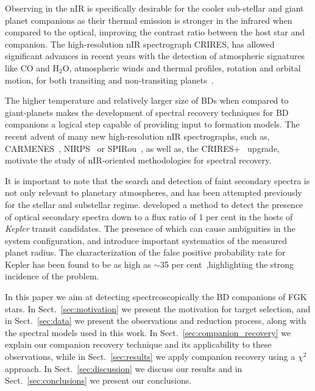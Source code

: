 \documentclass[fleqn,usenatbib]{mnras}
\newcommand*\bl{\color{blue}}
\begin{document}
    Observing in the nIR is specifically desirable for the cooler sub-stellar and giant planet companions as their thermal emission is stronger in the infrared {\bl when compared to the optical, improving the contrast ratio between the host star and companion. The high-resolution nIR spectrograph CRIRES, has allowed significant advances in recent years with the detection of atmospheric signatures like \(\textrm{CO}\) and \(\textrm{H}_{2}\textrm{O}\), atmospheric winds and thermal profiles, rotation and orbital motion, for both transiting and non-transiting planets~\citep[e.g.][]{snellen_orbital_2010, snellen_fast_2014, brogi_signature_2012, brogi_carbon_2014, brogi_rotation_2016, rodler_weighing_2012, dekok_detection_2013, piskorz_evidence_2016,  birkby_discovery_2017}.}
    
    The higher temperature and relatively larger size of BDs when compared to giant-planets makes the development of spectral recovery techniques for BD companions a logical step capable of providing input to formation models. {\bl The recent advent of many new high-resolution nIR spectrographs, such as, {CARMENES}~\citep{quirrenbach_carmenes_2014}, NIRPS~\citep{bouchy_nearinfrared_2017} or SPIRou~\citep{artigau_spirou_2014}, as well as, the CRIRES+~\citep{dorn_crires_2016} upgrade, motivate the study of nIR-oriented methodologies for spectral recovery.}
    
    {\bl It is important to note that the search and detection of faint secondary spectra is not only relevant to planetary atmospheres, and has been attempted previously for the stellar and substellar regime.} \citet{kolbl_detection_2015} developed a method to detect the presence of optical secondary spectra down to a flux ratio of 1 per cent in the hosts of \emph{Kepler} transit candidates. The presence of which can cause ambiguities in the system configuration, {\bl and introduce important systematics of the measured planet radius.} The characterization of the false positive probability rate for Kepler has been found to be as high as \(\sim\)35 per cent~\citet{santerne_sophie_2012},{\bl highlighting the strong incidence of the problem.}
    
    {\bl In this paper we aim at detecting spectrcoscopically the BD companions of FGK stars. In Sect.~\ref{sec:motivation} we present the motivation for target selection, and in Sect.~\ref{sec:data} we present the observations and reduction process, along with the spectral models used in this work. In Sect.~\ref{sec:companion_recovery} we explain our companion recovery technique and its applicability to these observations,} while in Sect.~\ref{sec:results} we apply companion recovery using a \(\chi^{2}\) approach. In Sect.~\ref{sec:discussion} we discuss our results and in Sect.~\ref{sec:conclusions} we present our conclusions.
    
\end{document}
